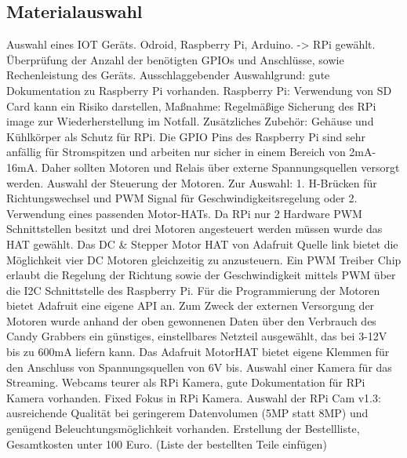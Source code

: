 \documentclass[BMR,Bachelor,ngerman]{twbook}%
\begin{document}
\subsection{Materialauswahl}
Auswahl eines IOT Geräts. Odroid, Raspberry Pi, Arduino. -> RPi gewählt. Überprüfung der Anzahl der benötigten GPIOs und Anschlüsse, sowie Rechenleistung des Geräts. Ausschlaggebender Auswahlgrund: gute Dokumentation zu Raspberry Pi vorhanden. Raspberry Pi: Verwendung von SD Card kann ein Risiko darstellen, Maßnahme: Regelmäßige Sicherung des RPi image zur Wiederherstellung im Notfall. Zusätzliches Zubehör: Gehäuse und Kühlkörper als Schutz für RPi. Die \ac{GPIO} Pins des Raspberry Pi sind sehr anfällig für Stromspitzen und arbeiten nur sicher in einem Bereich von 2mA-16mA. Daher sollten Motoren und Relais über externe Spannungsquellen versorgt werden. 
%
Auswahl der Steuerung der Motoren. Zur Auswahl: 1. H-Brücken für Richtungswechsel und PWM Signal für Geschwindigkeitsregelung oder 2. Verwendung eines passenden Motor-HATs. Da RPi nur 2 Hardware PWM Schnittstellen besitzt und drei Motoren angesteuert werden müssen wurde das HAT gewählt. Das DC \& Stepper Motor HAT von Adafruit {\color{red}Quelle link} bietet die Möglichkeit vier DC Motoren gleichzeitig zu anzusteuern. Ein \ac{PWM} Treiber Chip erlaubt die Regelung der Richtung sowie der Geschwindigkeit mittels \ac{PWM} über die \ac{I2C} Schnittstelle des Raspberry Pi. Für die Programmierung der Motoren bietet Adafruit eine eigene \ac{API} an. Zum Zweck der externen Versorgung der Motoren wurde anhand der oben gewonnenen Daten über den Verbrauch des Candy Grabbers ein günstiges, einstellbares Netzteil ausgewählt, das bei 3-12V bis zu 600mA liefern kann. Das Adafruit MotorHAT bietet eigene Klemmen für den Anschluss von Spannungsquellen von 6V bis. 
%
Auswahl einer Kamera für das Streaming. Webcams teurer als RPi Kamera, gute Dokumentation für RPi Kamera vorhanden. Fixed Fokus in RPi Kamera. Auswahl der RPi Cam v1.3: ausreichende Qualität bei geringerem Datenvolumen (5MP statt 8MP) und genügend Beleuchtungsmöglichkeit vorhanden. Erstellung der Bestellliste, Gesamtkosten unter 100 Euro. (Liste der bestellten Teile einfügen)
\end{document}
